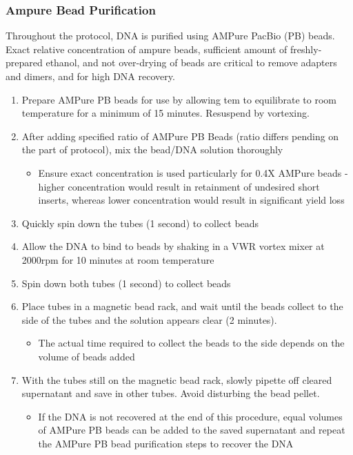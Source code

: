 \subsubsection{Ampure Bead Purification}
Throughout the protocol, DNA is purified using AMPure PacBio (PB) beads. Exact relative concentration of ampure beads, sufficient amount of freshly-prepared ethanol, and not over-drying of beads are critical to remove adapters and dimers, and for high DNA recovery.   
\label{general_ampure_bead_purification}
\begin{enumerate}
	\item Prepare AMPure PB beads for use by allowing tem to equilibrate to room temperature for a minimum of 15 minutes. Resuspend by vortexing.
	\item After adding specified ratio of AMPure PB Beads (ratio differs pending on the part of protocol), mix the bead/DNA solution thoroughly 
	\begin{itemize}
		\item Ensure exact concentration is used particularly for 0.4X AMPure beads - higher concentration would result in retainment of undesired short inserts, whereas lower concentration would result in significant yield loss 
	\end{itemize} 
	\item Quickly spin down the tubes (1 second) to collect beads 
	\item Allow the DNA to bind to beads by shaking in a VWR vortex mixer at 2000rpm for 10 minutes at room temperature 
	\item Spin down both tubes (1 second) to collect beads 
	\item Place tubes in a magnetic bead rack, and wait until the beads collect to the side of the tubes and the solution appears clear (2 minutes).
	\begin{itemize}
		\item The actual time required to collect the beads to the side depends on the volume of beads added
	\end{itemize} 
	\item With the tubes still on the magnetic bead rack, slowly pipette off cleared supernatant and save in other tubes. Avoid disturbing the bead pellet.
		\begin{itemize}
		\item If the DNA is not recovered at the end of this procedure, equal volumes of AMPure PB beads can be added to the saved supernatant and repeat the AMPure PB bead purification steps to recover the DNA

\end{itemize}
\end{enumerate}
